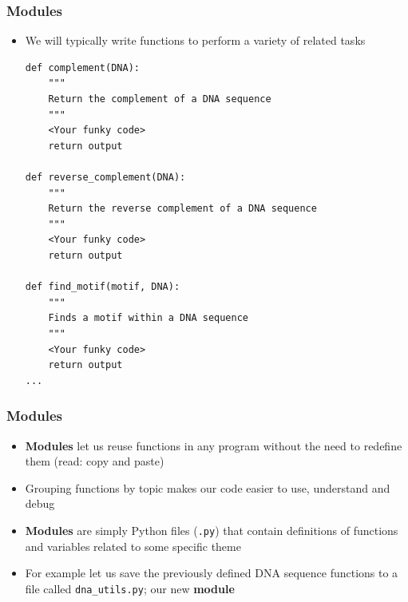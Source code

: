 \documentclass[xcolor=table]{beamer}
\begin{document}
\begin{frame}[fragile]
\frametitle{Modules}

\begin{itemize}
	\item We will typically write functions to perform a variety of related
	tasks

\begin{lstlisting}[style=python]
def complement(DNA):
    """
    Return the complement of a DNA sequence 
    """
    <Your funky code>
    return output

def reverse_complement(DNA):
    """
    Return the reverse complement of a DNA sequence 
    """
    <Your funky code>
    return output 

def find_motif(motif, DNA):
    """
    Finds a motif within a DNA sequence 
    """
    <Your funky code>
    return output 
...
\end{lstlisting}

\end{itemize}
\end{frame}

\begin{frame}[fragile]
\frametitle{Modules}

\begin{itemize}\addtolength{\itemsep}{1.2\baselineskip}
	
	\item<1-> \textbf{Modules} let us reuse functions in any program 
	without the need to redefine them (read: copy and paste)

	\item<2-> Grouping functions by topic makes our code easier to use, understand and debug

	\item<3-> \textbf{Modules} are simply Python files (\texttt{.py}) that contain
	definitions of functions and variables related to some specific theme

	\item<4-> For example let us save the previously defined DNA sequence functions
	to a file called \texttt{dna\_utils.py}; our new \textbf{module}
	 

\end{itemize}
\end{frame}
\end{document}
